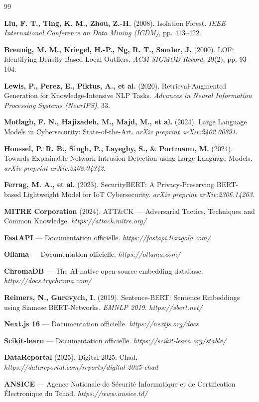\documentclass[12pt,a4paper]{report}
\begin{document}
\begin{thebibliography}{99}

\textbf{Liu, F. T., Ting, K. M., Zhou, Z.-H.} (2008).
Isolation Forest.
\textit{IEEE International Conference on Data Mining (ICDM)}, pp. 413--422.

\textbf{Breunig, M. M., Kriegel, H.-P., Ng, R. T., Sander, J.} (2000).
LOF: Identifying Density-Based Local Outliers.
\textit{ACM SIGMOD Record}, 29(2), pp. 93--104.

\textbf{Lewis, P., Perez, E., Piktus, A., et al.} (2020).
Retrieval-Augmented Generation for Knowledge-Intensive NLP Tasks.
\textit{Advances in Neural Information Processing Systems (NeurIPS)}, 33.

\textbf{Motlagh, F. N., Hajizadeh, M., Majd, M., et al.} (2024).
Large Language Models in Cybersecurity: State-of-the-Art.
\textit{arXiv preprint arXiv:2402.00891}.

\textbf{Houssel, P. R. B., Singh, P., Layeghy, S., \& Portmann, M.} (2024).
Towards Explainable Network Intrusion Detection using Large Language Models.
\textit{arXiv preprint arXiv:2408.04342}.

\textbf{Ferrag, M. A., et al.} (2023).
SecurityBERT: A Privacy-Preserving BERT-based Lightweight Model
for IoT Cybersecurity.
\textit{arXiv preprint arXiv:2306.14263}.

\textbf{MITRE Corporation} (2024).
ATT\&CK — Adversarial Tactics, Techniques and Common Knowledge.
\textit{https://attack.mitre.org/}

\textbf{FastAPI} — Documentation officielle.
\textit{https://fastapi.tiangolo.com/}

\textbf{Ollama} — Documentation officielle.
\textit{https://ollama.com/}

\textbf{ChromaDB} — The AI-native open-source embedding database.
\textit{https://docs.trychroma.com/}

\textbf{Reimers, N., Gurevych, I.} (2019).
Sentence-BERT: Sentence Embeddings using Siamese BERT-Networks.
\textit{EMNLP 2019}. \textit{https://sbert.net/}

\textbf{Next.js 16} — Documentation officielle.
\textit{https://nextjs.org/docs}

\textbf{Scikit-learn} — Documentation officielle.
\textit{https://scikit-learn.org/stable/}

\textbf{DataReportal} (2025). Digital 2025: Chad.
\textit{https://datareportal.com/reports/digital-2025-chad}

\textbf{ANSICE} — Agence Nationale de Sécurité Informatique et de
Certification Électronique du Tchad.
\textit{https://www.ansice.td/}

\end{thebibliography}
\end{document}
